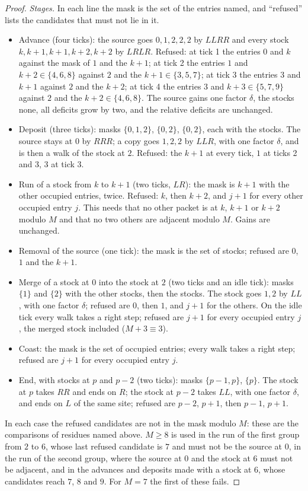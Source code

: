 \begin{proof}
\emph{Stages.} In each line the mask is the set of the entries named, and ``refused'' lists the candidates that must not lie in it.
\begin{itemize}
\item Advance (four ticks): the source goes $0,1,2,2,2$ by $LLRR$ and every stock $k,k+1,k+1,k+2,k+2$ by $LRLR$. Refused: at tick 1 the entries $0$ and $k$ against the mask of $1$ and the $k+1$; at tick 2 the entries $1$ and $k+2\in\{4,6,8\}$ against $2$ and the $k+1\in\{3,5,7\}$; at tick 3 the entries $3$ and $k+1$ against $2$ and the $k+2$; at tick 4 the entries $3$ and $k+3\in\{5,7,9\}$ against $2$ and the $k+2\in\{4,6,8\}$. The source gains one factor $\delta$, the stocks none, all deficits grow by two, and the relative deficits are unchanged.
\item Deposit (three ticks): masks $\{0,1,2\}$, $\{0,2\}$, $\{0,2\}$, each with the stocks. The source stays at $0$ by $RRR$; a copy goes $1,2,2$ by $LLR$, with one factor $\delta$, and is then a walk of the stock at $2$. Refused: the $k+1$ at every tick, $1$ at ticks 2 and 3, $3$ at tick 3.
\item Run of a stock from $k$ to $k+1$ (two ticks, $LR$): the mask is $k+1$ with the other occupied entries, twice. Refused: $k$, then $k+2$, and $j+1$ for every other occupied entry $j$. This needs that no other packet is at $k$, $k+1$ or $k+2$ modulo $M$ and that no two others are adjacent modulo $M$. Gains are unchanged.
\item Removal of the source (one tick): the mask is the set of stocks; refused are $0$, $1$ and the $k+1$.
\item Merge of a stock at $0$ into the stock at $2$ (two ticks and an idle tick): masks $\{1\}$ and $\{2\}$ with the other stocks, then the stocks. The stock goes $1,2$ by $LL$, with one factor $\delta$; refused are $0$, then $1$, and $j+1$ for the others. On the idle tick every walk takes a right step; refused are $j+1$ for every occupied entry $j$, the merged stock included ($M+3\equiv3$).
\item Coast: the mask is the set of occupied entries; every walk takes a right step; refused are $j+1$ for every occupied entry $j$.
\item End, with stocks at $p$ and $p-2$ (two ticks): masks $\{p-1,p\}$, $\{p\}$. The stock at $p$ takes $RR$ and ends on $R$; the stock at $p-2$ takes $LL$, with one factor $\delta$, and ends on $L$ of the same site; refused are $p-2$, $p+1$, then $p-1$, $p+1$.
\end{itemize}
In each case the refused candidates are not in the mask modulo $M$: these are the comparisons of residues named above. $M\ge8$ is used in the run of the first group from $2$ to $6$, whose last refused candidate is $7$ and must not be the source at $0$, in the run of the second group, where the source at $0$ and the stock at $6$ must not be adjacent, and in the advances and deposits made with a stock at $6$, whose candidates reach $7$, $8$ and $9$. For $M=7$ the first of these fails.


\end{proof}
